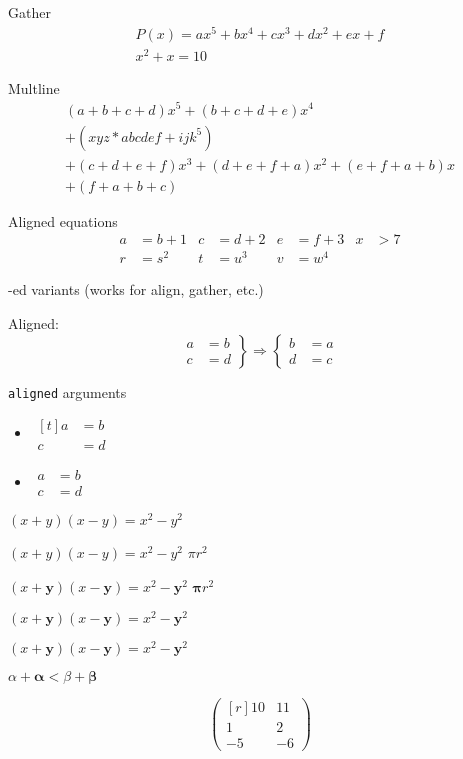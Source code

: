 \documentclass[a4paper]{article}
\begin{document}
Gather
\begin{gather}
  P(x)=ax^{5}+bx^{4}+cx^{3}+dx^{2}+ex +f\\
  x^2+x=10
\end{gather}

Multline
\begin{multline*}
   (a+b+c+d)x^{5}+(b+c+d+e)x^{4} \\
   	+(xyz*abcdef+ijk^{5}) \\
    +(c+d+e+f)x^{3}+(d+e+f+a)x^{2}+(e+f+a+b)x\\
    + (f+a+b+c)
\end{multline*}

Aligned equations
\begin{align*}
a &= b+1   &  c &= d+2  &  e &= f+3 & x &> 7  \\
r &= s^{2} &  t &=u^{3} &  v &= w^{4}
\end{align*}


-ed variants (works for align, gather, etc.)

Aligned:
\[
\left.\begin{aligned}
a&=b\\
c&=d
\end{aligned}\right\}
\Longrightarrow
\left\{\begin{aligned}
b&=a\\
d&=c
\end{aligned}\right.
\]

\texttt{aligned} arguments

\begin{itemize}
\item 
$\begin{aligned}[t]
a&=b\\
c&=d
\end{aligned}$
\item 
$\begin{aligned}
a&=b\\
c&=d
\end{aligned}$
\end{itemize}


$(x+y)(x-y)=x^{2}-y^{2}$

{\boldmath $(x+y)(x-y)=x^{2}-y^{2}$ $\pi r^2$}

$(x+\mathbf{y})(x-\mathbf{y})=x^{2}-{\mathbf{y}}^{2}$
$\mathbf{\pi} r^2$ %

\vspace{1cm}

$(x+\mathbf{y})(x-\mathbf{y})=x^{2}-{\mathbf{y}}^{2}$

$(x+\bm{y})(x-\bm{y}) \bm{=} x^{2}-{\bm{y}}^{2}$

$\alpha + \bm{\alpha} < \beta + \bm{\beta}$


\[
\begin{pmatrix*}[r]
  10&11\\
   1&2\\
  -5&-6
\end{pmatrix*}
\]
\end{document}
